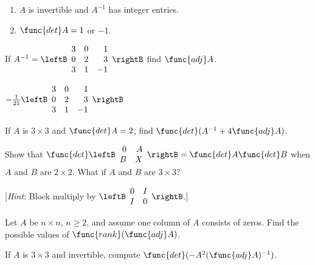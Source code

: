 \begin{multicols}{2}
\begin{ex}
\begin{enumerate}
\item $A$ is invertible and $A^{-1}$ has integer entries.

\item $\func{det }A = 1$ or $-1$.

\end{enumerate}
\end{ex}

\begin{ex}
If $A^{-1} = \leftB \begin{array}{rrr}
3 & 0 & 1 \\ 
0 & 2 & 3 \\
3 & 1 & -1 
\end{array}\rightB$
 find $\func{adj }A$.

\begin{sol}
$-\frac{1}{21}\leftB\begin{array}{rrr}
3 & 0 & 1 \\
0 & 2 & 3\\
3 & 1 & -1 
\end{array}\rightB$
\end{sol}
\end{ex}

\begin{ex}
If $A$ is $3 \times 3$ and $\func{det }A = 2$, find $\func{det}(A^{-1} + 4 \func{adj }A)$.
\end{ex}

\begin{ex}
Show that $\func{det} \leftB \begin{array}{rr}
0 & A \\
B & X 
\end{array}\rightB = \func{det }A \func{det }B$ when $A$ and $B$ are $2 \times 2$. What if $A$ and $B$ are $3 \times 3$?


[\textit{Hint}: Block multiply by $ \leftB \begin{array}{rr}
0 & I \\
I & 0 
\end{array}\rightB$.]
\end{ex}

\begin{ex}
Let $A$ be $n \times n$, $n \geq 2$, and assume one column of $A$ consists of zeros. Find the possible values of $\func{rank}(\func{adj }A)$.
\end{ex}

\begin{ex}
If $A$ is $3 \times 3$ and invertible, compute $\func{det}(-A^{2}(\func{adj }A)^{-1})$.
\end{ex}



\end{multicols}
